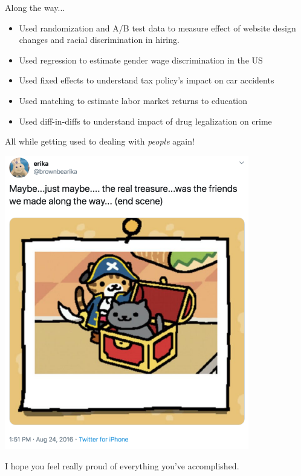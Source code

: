 \documentclass[11pt]{beamer}
\begin{document}
\begin{frame}[c]{Along the way...}
    \begin{itemize}
        \pause \item  Used randomization and A/B test data to measure effect of website design changes and racial discrimination in hiring.
        \pause \item  Used regression to estimate gender wage discrimination in the US
        \pause \item  Used fixed effects to understand tax policy's impact on car accidents
        \pause \item  Used matching to estimate labor market returns to education
        \pause \item  Used diff-in-diffs to understand impact of drug legalization on crime
    \end{itemize}
    \pause 
    \alert{All while getting used to dealing with \emph{people} again!}
\end{frame}

\begin{frame}[c]
\pause 
\centering
      \includegraphics[width=0.8\textwidth]{maybe_the_real_treasure.png}
\end{frame}

\begin{frame}[c]
    \centering 
    \alert{I hope you feel really proud of everything you've accomplished.}
\end{frame}
    
\end{document}
